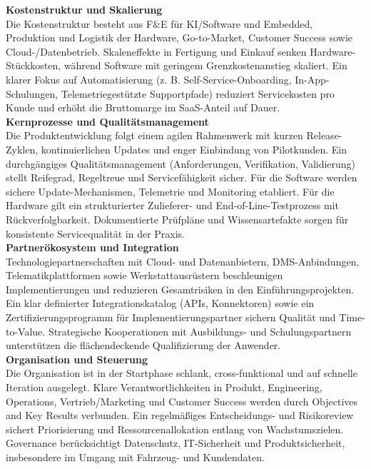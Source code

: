 \textbf{Kostenstruktur und Skalierung}\\
Die Kostenstruktur besteht aus F\&E für \ac{KI}/Software und Embedded, Produktion und Logistik der Hardware, Go-to-Market, Customer Success sowie Cloud-/Datenbetrieb. Skaleneffekte in Fertigung und Einkauf senken Hardware-Stückkosten, während Software mit geringem Grenzkostenanstieg skaliert. Ein klarer Fokus auf Automatisierung (z. B. Self-Service-Onboarding, In-App-Schulungen, Telemetriegestützte Supportpfade) reduziert Servicekosten pro Kunde und erhöht die Bruttomarge im \ac{SaaS}-Anteil auf Dauer. \\

\textbf{Kernprozesse und Qualitätsmanagement}\\
Die Produktentwicklung folgt einem agilen Rahmenwerk mit kurzen Release-Zyklen, kontinuierlichen Updates und enger Einbindung von Pilotkunden. Ein durchgängiges Qualitätsmanagement (Anforderungen, Verifikation, Validierung) stellt Reifegrad, Regeltreue und Servicefähigkeit sicher. Für die Software werden sichere Update-Mechanismen, Telemetrie und Monitoring etabliert. Für die Hardware gilt ein strukturierter Zulieferer- und End-of-Line-Testprozess mit Rückverfolgbarkeit. Dokumentierte Prüfpläne und Wissensartefakte sorgen für konsistente Servicequalität in der Praxis.\\

\textbf{Partnerökosystem und Integration}\\
Technologiepartnerschaften mit Cloud- und Datenanbietern, DMS-Anbindungen, Telematikplattformen sowie Werkstattausrüstern beschleunigen Implementierungen und reduzieren Gesamtrisiken in den Einführungsprojekten. Ein klar definierter Integrationskatalog (APIs, Konnektoren) sowie ein Zertifizierungsprogramm für Implementierungspartner sichern Qualität und Time-to-Value. Strategische Kooperationen mit Ausbildungs- und Schulungspartnern unterstützen die flächendeckende Qualifizierung der Anwender. \\

\textbf{Organisation und Steuerung} \\
Die Organisation ist in der Startphase schlank, cross-funktional und auf schnelle Iteration ausgelegt. Klare Verantwortlichkeiten in Produkt, Engineering, Operations, Vertrieb/Marketing und Customer Success werden durch Objectives and Key Results verbunden. Ein regelmäßiges Entscheidungs- und Risikoreview sichert Priorisierung und Ressourcenallokation entlang von Wachstumszielen. Governance berücksichtigt Datenschutz, IT-Sicherheit und Produktsicherheit, insbesondere im Umgang mit Fahrzeug- und Kundendaten. \\

